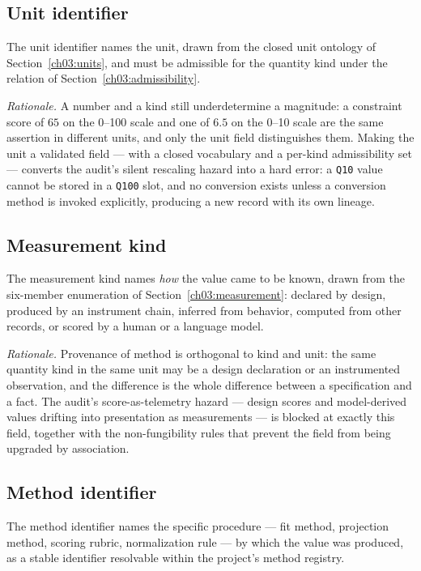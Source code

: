 \subsection{Unit identifier}\label{ch03:field:unit}

The unit identifier names the unit, drawn from the closed unit ontology of Section~\ref{ch03:units}, and must be admissible for the quantity kind under the relation of Section~\ref{ch03:admissibility}.

\emph{Rationale.} A number and a kind still underdetermine a magnitude: a constraint score of $65$ on the 0--100 scale and one of $6.5$ on the 0--10 scale are the same assertion in different units, and only the unit field distinguishes them. Making the unit a validated field --- with a closed vocabulary and a per-kind admissibility set --- converts the audit's silent rescaling hazard into a hard error: a \texttt{Q10} value cannot be stored in a \texttt{Q100} slot, and no conversion exists unless a conversion method is invoked explicitly, producing a new record with its own lineage.

\subsection{Measurement kind}\label{ch03:field:mkind}

The measurement kind names \emph{how} the value came to be known, drawn from the six-member enumeration of Section~\ref{ch03:measurement}: declared by design, produced by an instrument chain, inferred from behavior, computed from other records, or scored by a human or a language model.

\emph{Rationale.} Provenance of method is orthogonal to kind and unit: the same quantity kind in the same unit may be a design declaration or an instrumented observation, and the difference is the whole difference between a specification and a fact. The audit's score-as-telemetry hazard --- design scores and model-derived values drifting into presentation as measurements --- is blocked at exactly this field, together with the non-fungibility rules that prevent the field from being upgraded by association.

\subsection{Method identifier}\label{ch03:field:method}

The method identifier names the specific procedure --- fit method, projection method, scoring rubric, normalization rule --- by which the value was produced, as a stable identifier resolvable within the project's method registry.

